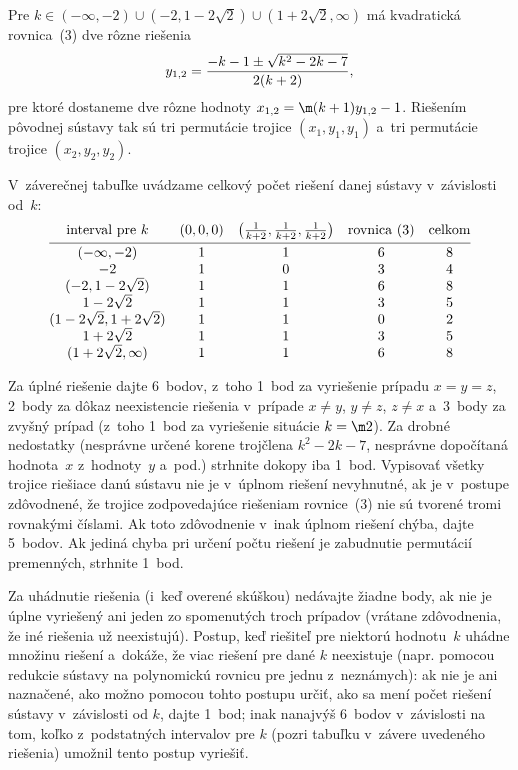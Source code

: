 {Pre $k\in (-\infty,-2)\cup(-2,1-2 \sqrt2) \cup (1+2 \sqrt2, \infty)$
má kvadratická rovnica~(3) dve rôzne riešenia
$$
y_{1,2} = {-k-1 \pm \sqrt {k^2-2k-7} \over 2 (k+2)},
$$
pre ktoré dostaneme dve rôzne hodnoty $x_{1,2} = \m(k+1)y_{1,2} -1$.
Riešením pôvodnej sústavy tak sú tri permutácie trojice $(x_1, y_1, y_1)$
a~tri permutácie trojice $(x_2, y_2, y_2)$.

V~záverečnej tabuľke uvádzame celkový počet riešení danej sústavy
v~závislosti od~$k$:
$$
\vbox
{\let\\=\cr
\halign{\hss#\unskip\hss&&\quad\hss#\unskip\hss\cr
interval pre $k$&$(0,0,0)$&$\big({1 \over k+2}, {1 \over
k+2}, {1 \over k+2}\big)$&rovnica \thetag{3}&celkom \\ \noalign{\vskip2pt\hrule\vskip2pt}
$(- \infty,-2)$&1&1& 6&8 \\
$-2$&1&0& 3&4 \\
$(- 2, 1-2 \sqrt2)$&1&1& 6&8 \\
$1-2 \sqrt2$&1&1& 3&5 \\
$(1-2 \sqrt 2, 1+2 \sqrt 2)$&1&1& 0&2 \\
$1+2 \sqrt 2$&1&1& 3&5 \\
$(1+2 \sqrt2, \infty)$&1&1& 6&8\\
}}
$$

\nobreak\medskip\petit\noindent
Za úplné riešenie dajte 6~bodov, z~toho 1~bod za vyriešenie prípadu
$x = y = z$, 2~body za dôkaz neexistencie riešenia v~prípade $x \ne y$,
$y \ne z$, $z\ne x$ a~3~body za zvyšný prípad (z~toho 1~bod za
vyriešenie situácie $k=\m2$). Za drobné nedostatky (nesprávne určené
korene trojčlena $k^2-2k-7$, nesprávne dopočítaná hodnota~$x$
z~hodnoty~$y$ a~pod.) strhnite dokopy iba 1~bod.
Vypisovať všetky trojice riešiace danú sústavu nie je
v~úplnom riešení nevyhnutné, ak je v~postupe
zdôvodnené, že trojice zodpovedajúce riešeniam rovnice~(3) nie sú tvorené tromi
rovnakými číslami. Ak toto zdôvodnenie v~inak úplnom riešení chýba, dajte 5~bodov.
Ak jediná chyba
pri určení počtu riešení je zabudnutie permutácií premenných, strhnite 1~bod.

Za uhádnutie riešenia (i~keď overené skúškou) nedávajte žiadne body,
ak nie je úplne vyriešený ani jeden zo spomenutých troch prípadov
(vrátane zdôvodnenia, že iné riešenia už neexistujú). Postup, keď
riešiteľ pre niektorú hodnotu~$k$ uhádne množinu riešení a~dokáže, že
viac riešení pre dané $k$ neexistuje (napr. pomocou redukcie sústavy na
polynomickú rovnicu pre jednu z~neznámych): ak nie je ani naznačené,
ako možno pomocou tohto postupu určiť, ako sa mení počet riešení
sústavy v~závislosti od $k$, dajte 1~bod; inak nanajvýš 6~bodov
v~závislosti na tom, koľko z~podstatných intervalov pre $k$ (pozri tabuľku
v~závere uvedeného riešenia) umožnil tento postup vyriešiť.

\endpetit
\bigbreak
}

